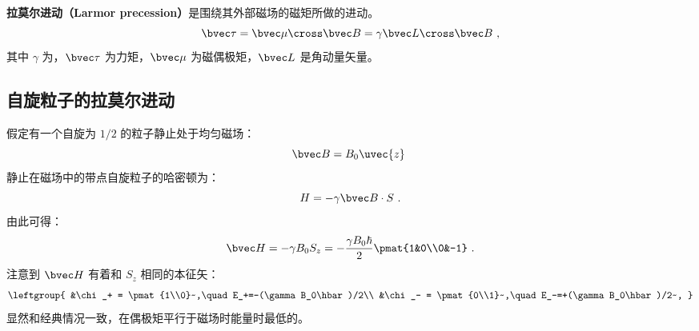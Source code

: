 
\textbf{拉莫尔进动（Larmor precession）}是围绕其外部磁场的磁矩所做的进动。
\begin{equation}
\bvec \tau = \bvec\mu\cross\bvec B=\gamma\bvec L\cross \bvec B~,
\end{equation}
其中 $\gamma$ 为，$\bvec\tau$ 为力矩，$\bvec \mu$ 为磁偶极矩，$\bvec L$ 是角动量矢量。



\subsection{自旋粒子的拉莫尔进动}

假定有一个自旋为 $1/2$ 的粒子静止处于均匀磁场：
\begin{equation}
\bvec B =B_0\uvec{z}~
\end{equation}
静止在磁场中的带点自旋粒子的哈密顿为：
\begin{equation}
H = -\gamma\bvec B\cdot S~.
\end{equation}
由此可得：
\begin{equation}
\bvec H = -\gamma B_0S_z=-\frac{\gamma B_0\hbar}{2}\pmat{1&0\\0&-1}~.
\end{equation}
注意到 $\bvec H$ 有着和 $S_z$ 相同的本征矢：
\begin{equation}
\leftgroup{
&\chi_+ = \pmat{1\\0}~,\quad E_+=-(\gamma B_0\hbar)/2\\
&\chi_- = \pmat{0\\1}~,\quad E_-=+(\gamma B_0\hbar)/2~,
}\end{equation}
显然和经典情况一致，在偶极矩平行于磁场时能量时最低的。

